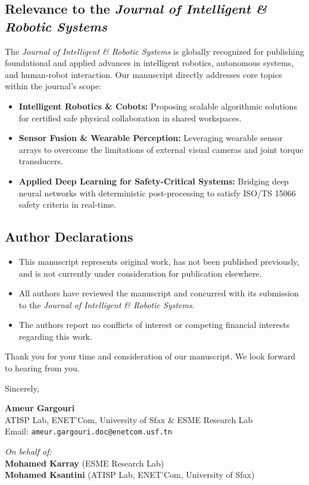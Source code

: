 \documentclass[11pt,a4paper]{article}
\begin{document}
\subsection*{Relevance to the \textit{Journal of Intelligent \& Robotic Systems}}
The \textit{Journal of Intelligent \& Robotic Systems} is globally recognized for publishing foundational and applied advances in intelligent robotics, autonomous systems, and human-robot interaction. Our manuscript directly addresses core topics within the journal's scope:
\begin{itemize}[leftmargin=*,itemsep=2pt,topsep=2pt]
    \item \textbf{Intelligent Robotics \& Cobots:} Proposing scalable algorithmic solutions for certified safe physical collaboration in shared workspaces.
    \item \textbf{Sensor Fusion \& Wearable Perception:} Leveraging wearable sensor arrays to overcome the limitations of external visual cameras and joint torque transducers.
    \item \textbf{Applied Deep Learning for Safety-Critical Systems:} Bridging deep neural networks with deterministic post-processing to satisfy ISO/TS 15066 safety criteria in real-time.
\end{itemize}

\subsection*{Author Declarations}
\begin{itemize}[leftmargin=*,itemsep=2pt,topsep=2pt]
    \item This manuscript represents original work, has not been published previously, and is not currently under consideration for publication elsewhere.
    \item All authors have reviewed the manuscript and concurred with its submission to the \textit{Journal of Intelligent \& Robotic Systems}.
    \item The authors report no conflicts of interest or competing financial interests regarding this work.
\end{itemize}

Thank you for your time and consideration of our manuscript. We look forward to hearing from you.

\vspace{1.5em}

Sincerely,

\vspace{1em}
\textbf{Ameur Gargouri} \\
ATISP Lab, ENET'Com, University of Sfax \& ESME Research Lab \\
Email: \texttt{ameur.gargouri.doc@enetcom.usf.tn}

\vspace{0.8em}
\textit{On behalf of:} \\
\textbf{Mohamed Karray} (ESME Research Lab) \\
\textbf{Mohamed Ksantini} (ATISP Lab, ENET'Com, University of Sfax)
\end{document}
